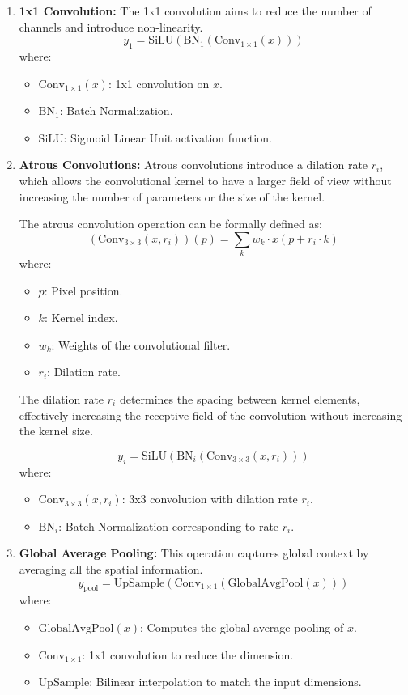 \documentclass[conference]{IEEEtran}
\begin{document}
\begin{enumerate}
    \item \textbf{1x1 Convolution:}
    The 1x1 convolution aims to reduce the number of channels and introduce non-linearity.
    \[
    y_1 = \text{SiLU}(\text{BN}_1(\text{Conv}_{1 \times 1}(x)))
    \]
    where:
    \begin{itemize}
        \item $ \text{Conv}_{1 \times 1}(x) $: 1x1 convolution on $ x $.
        \item $ \text{BN}_1 $: Batch Normalization.
        \item $ \text{SiLU} $: Sigmoid Linear Unit activation function.
    \end{itemize}

    \item \textbf{Atrous Convolutions:}
    Atrous convolutions introduce a dilation rate $ r_i $, which allows the convolutional kernel to have a larger field of view without increasing the number of parameters or the size of the kernel.

    The atrous convolution operation can be formally defined as:
    \[
    (\text{Conv}_{3 \times 3}(x, r_i))(p) = \sum_{k} w_k \cdot x(p + r_i \cdot k)
    \]
    where:
    \begin{itemize}
        \item $ p $: Pixel position.
        \item $ k $: Kernel index.
        \item $ w_k $: Weights of the convolutional filter.
        \item $ r_i $: Dilation rate.
    \end{itemize}

    The dilation rate $ r_i $ determines the spacing between kernel elements, effectively increasing the receptive field of the convolution without increasing the kernel size.

    \[
    y_i = \text{SiLU}(\text{BN}_i(\text{Conv}_{3 \times 3}(x, r_i)))
    \]
    where:
    \begin{itemize}
        \item $ \text{Conv}_{3 \times 3}(x, r_i) $: 3x3 convolution with dilation rate $ r_i $.
        \item $ \text{BN}_i $: Batch Normalization corresponding to rate $ r_i $.
    \end{itemize}

    \item \textbf{Global Average Pooling:}
    This operation captures global context by averaging all the spatial information.
    \[
    y_{\text{pool}} = \text{UpSample}(\text{Conv}_{1 \times 1}(\text{GlobalAvgPool}(x)))
    \]
    where:
    \begin{itemize}
        \item $ \text{GlobalAvgPool}(x) $: Computes the global average pooling of $ x $.
        \item $ \text{Conv}_{1 \times 1} $: 1x1 convolution to reduce the dimension.
        \item $ \text{UpSample} $: Bilinear interpolation to match the input dimensions.
    \end{itemize}


\end{enumerate}
\end{document}
